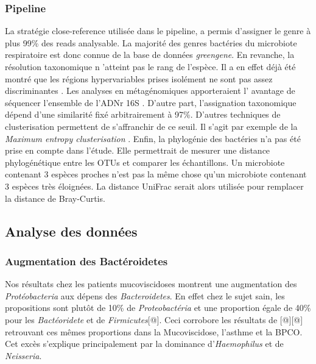 \documentclass[12pt,a4paper]{article}
\begin{document}
\subsubsection{Pipeline}
La stratégie close-reference utilisée dans le pipeline, a permis d'assigner le genre à plus 99\% des reads analysable. La majorité des genres bactéries du microbiote respiratoire est donc connue de la base de données \textit{greengene}.
En revanche, la résolution taxonomique n 'atteint pas le rang de l'espèce. Il a en effet déjà été montré que les régions hypervariables prises isolément ne sont pas assez discriminantes \cite{Yang2016}. Les analyses en métagénomiques apporteraient l' avantage de séquencer l'ensemble de l'ADNr 16S \cite{Ranjan2016}.
D'autre part, l'assignation taxonomique dépend d'une similarité fixé arbitrairement à 97\%. D'autres techniques de clusterisation permettent de s'affranchir de ce seuil. Il s'agit par exemple de la \textit{Maximum entropy clusterisation} \cite{Bobadilla2015}. 
Enfin, la phylogénie des bactéries n'a pas été prise en compte dans l'étude. Elle permettrait de mesurer une distance phylogénétique entre les OTUs et comparer les échantillons. Un microbiote contenant 3 espèces proches n'est pas la même chose qu'un microbiote contenant 3 espèces très éloignées. La distance UniFrac\cite{Lozupone2005} serait alors utilisée pour remplacer la distance de Bray-Curtis. 


\subsection{Analyse des données}
\subsubsection{Augmentation des Bactéroidetes}
Nos résultats chez les patients mucoviscidoses montrent une augmentation des \textit{Protéobacteria} aux dépens des \textit{Bacteroidetes}. En effet chez le sujet sain, les propositions sont plutôt de 10\% de \textit{Proteobactéria} et une proportion égale de 40\% pour les \textit{Bactéoridete} et de \textit{Firmicutes}[@]. 
Ceci corrobore les résultats de [@][@] retrouvant ces mêmes proportions dans la Mucoviscidose, l’asthme et la BPCO. Cet excès s’explique principalement par la dominance d’\textit{Haemophilus} et de \textit{Neisseria}. 
\end{document}
